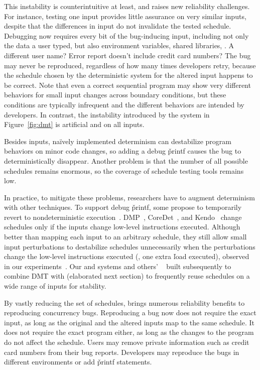 This instability is counterintuitive at least,
and raises new reliability challenges.  For instance, testing one input
provides little assurance on very similar inputs, despite that the differences
in input do not invalidate the tested schedule.  Debugging now requires
every bit of the bug-inducing input, including not only the data a user
typed, but also environment variables, shared libraries, \etc.  A
different user name?  Error report doesn't include credit card numbers?
The bug may never be reproduced, regardless of how many times developers
retry, because the schedule chosen by the deterministic system for the
altered input happens to be correct.  Note that even a correct
sequential program may show very different behaviors for small input
changes across boundary conditions, but these conditions are typically
infrequent and the different behaviors are intended by developers.  In
contrast, the instability introduced by the system in Figure~\ref{fig:dmt}
is artificial and on all inputs.

Besides inputs, na\"{i}vely implemented determinism can destabilize
program behaviors on minor code changes, so adding a debug \v{printf}
causes the bug to deterministically disappear.  Another problem is that
the number of all possible schedules remains enormous, so the coverage of
schedule testing tools remains low.

In practice, to mitigate these problems, researchers have to augment
determinism with other techniques.  To support debug \v{printf}, some
propose to temporarily revert to nondeterministic
execution~\cite{dmp:asplos09}.  DMP~\cite{dmp:asplos09},
CoreDet~\cite{coredet:asplos10}, and Kendo~\cite{kendo:asplos09} change
schedules only if the inputs change low-level instructions executed.
Although better than mapping each input to an arbitrary schedule, they
still allow small input perturbations to destabilize schedules
unnecessarily when the perturbations change the low-level instructions
executed (\eg, one extra \v{load} executed), observed in our
experiments~\cite{cui:tern:osdi10}. Our \tern and \peregrine systems and others'
\dthreads~\cite{dthreads:sosp11} built subsequently to \tern combine DMT
with \smt (elaborated next section) to frequently reuse schedules on a
wide range of inputs for stability.

By vastly reducing the set of schedules, \smt brings numerous reliability benefits
to reproducing concurrency bugs.  Reproducing a bug now does not require the exact input,
as long as the original and the altered inputs map to the same schedule.
It does not require the exact program either, as long as the changes to
the program do not affect the schedule.  Users may remove private
information such as credit card numbers from their bug reports. Developers
may reproduce the bugs in different environments or add \v{printf}
statements.


